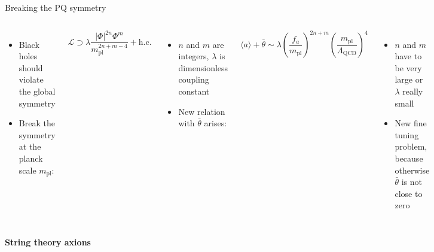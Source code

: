 \documentclass[aspectratio=1610, 9pt]{beamer}
\begin{document}
\begin{frame}{Breaking the PQ symmetry}
  \begin{columns}
    \column{\textwidth}
    \begin{itemize}
      \item Black holes should violate the global symmetry
      \item Break the symmetry at the planck scale $m_{\text{pl}}$:
    \end{itemize}
    \begin{equation*}
      \mathcal{L} \supset \lambda \frac{|\Phi|^{2n} \Phi^m}{m_{\text{pl}}^{2n+m-4}} + \text{h.c.}
    \end{equation*}
    \begin{itemize}
      \item $n$ and $m$ are integers, $\lambda$ is dimensionless coupling constant
      \item New relation with $\bar{\theta}$ arises:
    \end{itemize}
    \begin{equation*}
      \langle a \rangle + \bar{\theta} \sim \lambda \left( \frac{f_a}{m_{\text{pl}}} \right)^{2n+m} \left( \frac{m_{\text{pl}}}{\Lambda_{\text{QCD}}} \right)^4
    \end{equation*}
    \begin{itemize}
      \item $n$ and $m$ have to be very large or $\lambda$ really small
      \item New fine tuning problem, because otherwise $\bar{\theta}$ is not close to zero
    \end{itemize}
  \end{columns} 
\end{frame}

\begin{frame}[noframenumbering]
  \centering
  \Huge \textbf{\textcolor{tugreen}{String theory axions}}
\end{frame}
\end{document}
